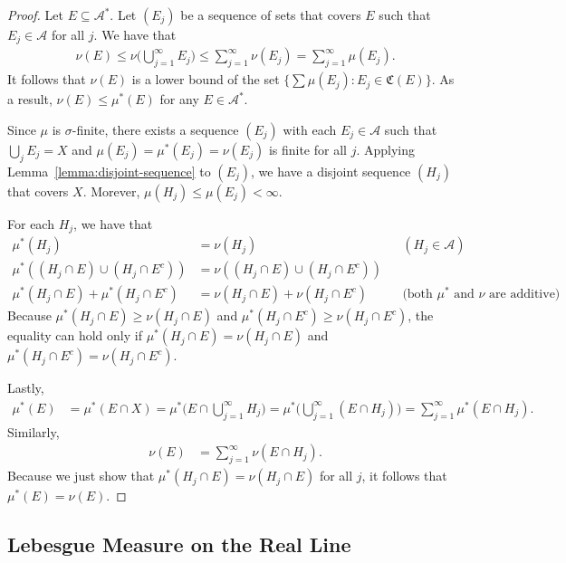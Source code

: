 \documentclass[10pt]{article}
\newcommand{\mcal}[1]{\mathcal{#1}}
\begin{document}
\begin{itemize}
\begin{proof}
    Let $E \subseteq \mcal{A}^*$. Let $(E_j)$ be a sequence of sets that covers $E$ such that $E_j \in \mcal{A}$ for all $j$. We have that
    \begin{align*}
      \nu(E) \leq \nu\bigg( \bigcup_{j=1}^\infty E_j \bigg) \leq \sum_{j=1}^\infty \nu(E_j) = \sum_{j=1}^\infty \mu(E_j).
    \end{align*}
    It follows that $\nu(E)$ is a lower bound of the set $\{ \sum \mu(E_j) : E_j \in \mathfrak{C}(E) \}$. As a result, $\nu(E) \leq \mu^*(E)$ for any $E \in \mcal{A}^*$.

    Since $\mu$ is $\sigma$-finite, there exists a sequence $(E_j)$ with each $E_j \in \mcal{A}$ such that $\bigcup_j E_j = X$ and $\mu(E_j) = \mu^*(E_j) = \nu(E_j)$ is finite for all $j$. Applying Lemma~\ref{lemma:disjoint-sequence} to $(E_j)$, we have a disjoint sequence $(H_j)$ that covers $X$. Morever, $\mu(H_j) \leq \mu(E_j) < \infty$.
    
    For each $H_j$, we have that
    \begin{align*}
      \mu^*(H_j) &= \nu(H_j) && (H_j \in \mcal{A}) \\
      \mu^*((H_j \cap E) \cup (H_j \cap E^c)) &= \nu((H_j \cap E) \cup (H_j \cap E^c)) && \\
      \mu^*(H_j \cap E) + \mu^*(H_j \cap E^c) &= \nu(H_j \cap E) + \nu(H_j \cap E^c) && \mbox{(both $\mu^*$ and $\nu$ are additive)}
    \end{align*}
    Because $\mu^*(H_j \cap E) \geq \nu(H_j \cap E)$ and $\mu^*(H_j \cap E^c) \geq \nu(H_j \cap E^c)$, the equality can hold only if $\mu^*(H_j \cap E) = \nu(H_j \cap E)$ and $\mu^*(H_j \cap E^c) = \nu(H_j \cap E^c)$.

    Lastly,
    \begin{align*}
      \mu^*(E) 
      &= \mu^*(E \cap X) 
      = \mu^*\bigg( E \cap \bigcup_{j=1}^\infty H_j \bigg)
      = \mu^*\bigg( \bigcup_{j=1}^\infty (E \cap H_j) \bigg)
      = \sum_{j=1}^\infty \mu^*(E \cap H_j).      
    \end{align*}
    Similarly,
    \begin{align*}
      \nu(E) &= \sum_{j=1}^\infty \nu(E \cap H_j).      
    \end{align*}
    Because we just show that $\mu^*(H_j \cap E) = \nu(H_j \cap E)$ for all $j$, it follows that $\mu^*(E) = \nu(E)$.
  \end{proof}
\end{itemize}

\subsection{Lebesgue Measure on the Real Line}
\end{document}
